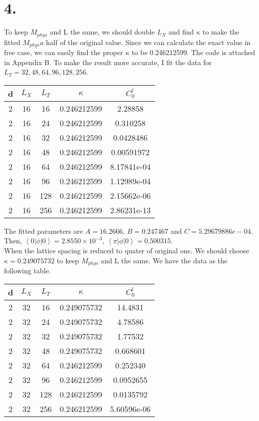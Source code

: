 \documentclass[12pt]{article}
\begin{document}
\section*{4.}
To keep $M_{phys}$ and L the same, we should double $L_X$ and find $\kappa$ to make the fitted $M_{phys}a$ half of the original value. Since we can calculate the exact value in free case, we can easily find the proper $\kappa$ to be 0.246212599.  The code is attached in Appendix B. To make the result more accurate, I fit the data for $L_T = 32, 48, 64, 96, 128, 256$. \\
\begin{center}
\begin{tabular}{|c|c|c|c|c|}
\hline 
d & $L_X$ & $L_T$ & $\kappa$ & $C^l_0$ \\ 
\hline 
2 & 16 & 16 & 0.246212599 & 2.28858\\ 
\hline 
2 & 16 & 24 & 0.246212599 & 0.310258\\ 
\hline 
2 & 16 & 32 & 0.246212599 & 0.0428486\\ 
\hline 
2 & 16 & 48 & 0.246212599 & 0.00591972\\ 
\hline 
2 & 16 & 64 & 0.246212599 & 8.17841e-04\\ 
\hline 
2 & 16 & 96 & 0.246212599 & 1.12989e-04\\ 
\hline 
2 & 16 & 128 & 0.246212599 & 2.15662e-06\\ 
\hline 
2 & 16 & 256 & 0.246212599 & 2.86231e-13\\ 
\hline 
\end{tabular}
\end{center}
The fitted parameters are $A = 16.2666$, $B = 0.247467$ and $C = 5.29679886e-04$. Then, $\left<0|\phi|0\right> = 2.8550\times10^{-3}$, $\left<\pi|\phi|0\right> = 0.500315$. \\
When the lattice spacing is reduced to quater of original one. We should choose $\kappa = 0.249075732$ to keep $M_{phys}$ and L the same. We have the data as the following table. \\
\begin{center}
\begin{tabular}{|c|c|c|c|c|}
\hline 
d & $L_X$ & $L_T$ & $\kappa$ & $C^l_0$ \\ 
\hline 
2 & 32 & 16 & 0.249075732 & 14.4831\\ 
\hline 
2 & 32 & 24 & 0.249075732 & 4.78586\\ 
\hline 
2 & 32 & 32 & 0.249075732 & 1.77532\\ 
\hline 
2 & 32 & 48 & 0.249075732 & 0.668601\\ 
\hline 
2 & 32 & 64 & 0.246212599 & 0.252340\\ 
\hline 
2 & 32 & 96 & 0.246212599 & 0.0952655\\ 
\hline 
2 & 32 & 128 & 0.246212599 & 0.0135792\\ 
\hline 
2 & 32 & 256 & 0.246212599 & 5.60596e-06\\ 
\hline 
\end{tabular}
\end{center}
\end{document}
